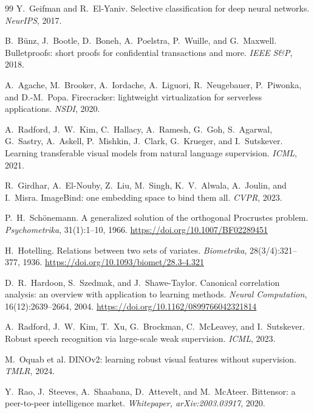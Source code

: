 \documentclass[11pt]{article}
\begin{document}
\begin{thebibliography}{99}
    Y.~Geifman and R.~El-Yaniv.
    Selective classification for deep neural networks.
    \emph{NeurIPS}, 2017.

    B.~B\"unz, J.~Bootle, D.~Boneh, A.~Poelstra, P.~Wuille, and
    G.~Maxwell.
    Bulletproofs: short proofs for confidential transactions and more.
    \emph{IEEE S\&P}, 2018.

    A.~Agache, M.~Brooker, A.~Iordache, A.~Liguori, R.~Neugebauer,
    P.~Piwonka, and D.-M.~Popa.
    Firecracker: lightweight virtualization for serverless
    applications.
    \emph{NSDI}, 2020.

    A.~Radford, J.~W.~Kim, C.~Hallacy, A.~Ramesh, G.~Goh, S.~Agarwal,
    G.~Sastry, A.~Askell, P.~Mishkin, J.~Clark, G.~Krueger, and
    I.~Sutskever.
    Learning transferable visual models from natural language
    supervision.
    \emph{ICML}, 2021.

    R.~Girdhar, A.~El-Nouby, Z.~Liu, M.~Singh, K.~V.~Alwala, A.~Joulin,
    and I.~Misra.
    ImageBind: one embedding space to bind them all.
    \emph{CVPR}, 2023.

    P.~H.~Sch\"onemann.
    A generalized solution of the orthogonal Procrustes problem.
    \emph{Psychometrika}, 31(1):1--10, 1966.
    \url{https://doi.org/10.1007/BF02289451}

    H.~Hotelling.
    Relations between two sets of variates.
    \emph{Biometrika}, 28(3/4):321--377, 1936.
    \url{https://doi.org/10.1093/biomet/28.3-4.321}

    D.~R.~Hardoon, S.~Szedmak, and J.~Shawe-Taylor.
    Canonical correlation analysis: an overview with application to
    learning methods.
    \emph{Neural Computation}, 16(12):2639--2664, 2004.
    \url{https://doi.org/10.1162/0899766042321814}

    A.~Radford, J.~W.~Kim, T.~Xu, G.~Brockman, C.~McLeavey, and
    I.~Sutskever.
    Robust speech recognition via large-scale weak supervision.
    \emph{ICML}, 2023.

    M.~Oquab et al.
    DINOv2: learning robust visual features without supervision.
    \emph{TMLR}, 2024.

    Y.~Rao, J.~Steeves, A.~Shaabana, D.~Attevelt, and M.~McAteer.
    Bittensor: a peer-to-peer intelligence market.
    \emph{Whitepaper, arXiv:2003.03917}, 2020.


\end{thebibliography}
\end{document}
